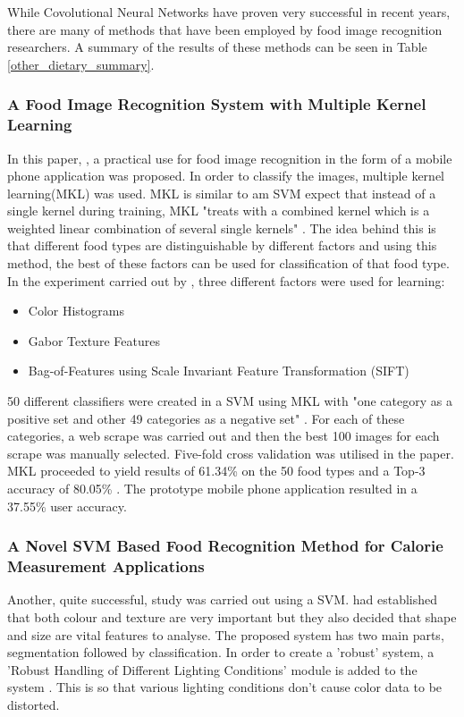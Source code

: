 While Covolutional Neural Networks have proven very successful in recent years, there are many of methods that have been employed by food image recognition researchers.
A summary of the results of these methods can be seen in Table \ref{other_dietary_summary}.

\subsubsection*{A Food Image Recognition System with Multiple Kernel Learning}
In this paper, \textcite{kernelLearning}, a practical use for food image recognition in the form of a mobile phone application was proposed. In order to classify the images, multiple kernel learning(MKL) was used. MKL is similar to am SVM expect that instead of a single kernel during training, MKL "treats with a combined kernel which is a weighted linear combination of several single kernels" \textcite{kernelLearning}. The idea behind this is that different food types are distinguishable by different factors and using this method, the best of these factors can be used for classification of that food type. In the experiment carried out by \textcite{kernelLearning}, three different factors were used for learning:
\begin{itemize}
	\item{Color Histograms}
	\item{Gabor Texture Features}
	\item{Bag-of-Features using Scale Invariant Feature Transformation (SIFT)}
\end{itemize}

50 different classifiers were created in a SVM using MKL with "one category as a positive set and other 49 categories as a negative set" \textcite{kernelLearning}. For each of these categories, a web scrape was carried out and then the best 100 images for each scrape was manually selected. Five-fold cross validation was utilised in the paper. MKL proceeded to yield results of 61.34\% on the 50 food types and a Top-3 accuracy of 80.05\% \textcite{kernelLearning}. The prototype mobile phone application resulted in a 37.55\% user accuracy.

\subsubsection*{A Novel SVM Based Food Recognition Method for Calorie Measurement Applications}
Another, quite successful, study was carried out using a SVM. \textcite{novelSVM} had established that both colour and texture are very important but they also decided that shape and size are vital features to analyse. The proposed system has two main parts, segmentation followed by classification. In order to create a 'robust' system, a 'Robust Handling of Different Lighting Conditions' module is added to the system \textcite{novelSVM}. This is so that various lighting conditions don't cause color data to be distorted. 

